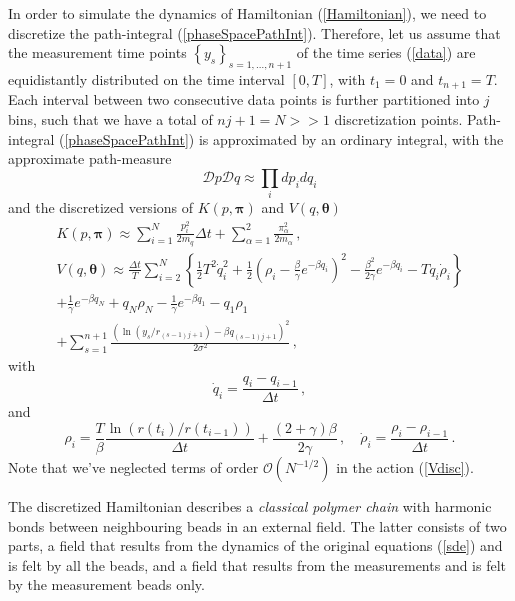 \documentclass[12pt,a4paper,final]{iopart}
\newcommand{\bt}{\pmb\theta}
\begin{document}
In order to simulate the dynamics of Hamiltonian (\ref{Hamiltonian}), we need to discretize the path-integral (\ref{phaseSpacePathInt}).
Therefore, let us assume that the measurement time points $\left\{ y_s \right\}_{s=1,\dots, n+1}$ of the time series (\ref{data}) are equidistantly distributed on the time interval $[0,T]$, with $t_1=0$ and $t_{n+1}=T$.
Each interval between two consecutive data points is further partitioned into $j$ bins, such that we have a total of $nj+1=N>>1$ discretization points.
Path-integral (\ref{phaseSpacePathInt}) is approximated by an ordinary integral, with the approximate path-measure
\begin{equation}
  \mathcal Dp\mathcal Dq
  \approx
  \prod_i dp_i dq_i
\end{equation}
and the discretized versions of $K( p,{\pmb\pi})$ and $V( q,\bt)$
\begin{eqnarray}
   K( p,{\pmb\pi}) \approx
   \sum_{i=1}^N
   \frac{ p_i^2}{2m_q}\Delta t
   +
   \sum_{\alpha=1}^2\frac{\pi_\alpha^2}{2m_\alpha}\,,\label{Kdisc}
   \\
   V(q,\bt) \approx \frac{\Delta t}{T} \sum_{i=2}^{N}
   \left\{ \frac{1}{2} T^2 \dot q_i^2 + \frac{1}{2}
     \left( \rho_i-\frac{\beta}{\gamma}e^{-\beta q_i} \right)^2 -
    \frac{\beta^2}{2\gamma} e^{-\beta q_i} - T q_i\dot\rho_i \right\}  \nonumber
  \\
  +
  \frac{1}{\gamma}
  e^{-\beta q_N}
  +
  q_N \rho_{N}
  -
  \frac{1}{\gamma}
  e^{-\beta q_1}
  -
  q_1 \rho_{1}
  \nonumber
  \\
  +
  \sum_{s=1}^{n+1}
  \frac{(\ln(y_s/r_{(s-1)j+1}) - {\beta q_{(s-1)j+1}})^2}{2\sigma^2}
  \label{Vdisc}
   \,,
\end{eqnarray}
with
\begin{equation}
  \dot q_i = \frac{q_i-q_{i-1}}{\Delta t}\,,
\end{equation}
and
\begin{equation}\label{rhodisc}
\rho_i = \frac{T}{\beta} \frac{\ln(r(t_{i})/r(t_{i-1}))}{\Delta t}
+
\frac{(2+\gamma)\beta}{2\gamma}
\,,\quad
\dot\rho_i = \frac{\rho_i-\rho_{i-1}}{\Delta t}\,.
\end{equation}
Note that we've neglected terms of order $\mathcal O(N^{-1/2})$ in the action (\ref{Vdisc}).

The discretized Hamiltonian describes a {\em classical polymer chain} with harmonic bonds between neighbouring beads in an external field. The latter consists of two parts, a field that results from the dynamics of the original equations (\ref{sde}) and is felt by all the beads, and a field that results from the measurements and is felt by the measurement beads only.
\end{document}
